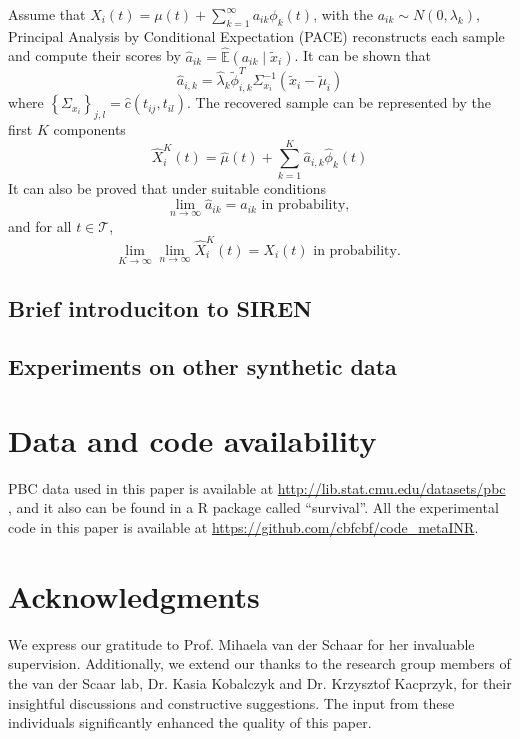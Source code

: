 \documentclass{article}
\begin{document}
Assume that $X_i(t)=\mu(t)+\sum_{k=1}^{\infty} a_{i k} \phi_k(t)$, with the $a_{i k} \sim N\left(0, \lambda_k\right)$,
Principal Analysis by Conditional Expectation (PACE) reconstructs each sample and compute their scores by $\widehat{a}_{i k}=\hat{\mathbb{E}}\left(a_{i k} \mid \tilde{x}_i\right)$.
It can be shown that 
$$
\widehat{a}_{i, k}=\widehat{\lambda}_k \tilde{\phi}_{i, k}^T \Sigma_{x_i}^{-1}\left(\tilde{x}_i-\tilde{\mu}_i\right)
$$
where $\left\{\Sigma_{x_i}\right\}_{j, l}=\widehat{c}\left(t_{ij}, t_{il}\right)$.
The recovered sample can be represented by the first $K$ components 
$$\widehat{X}_i^K(t)=\widehat{\mu}(t)+\sum_{k=1}^K \widehat{a}_{i, k} \widehat{\phi}_k(t)$$
It can also be proved \cite{yao2005functional}  that under suitable conditions
$$
\lim _{n \rightarrow \infty} \hat{a}_{i k}={a}_{i k} \text { in probability, }
$$
and for all $t \in \mathcal{T}$,
$$
\lim _{K \rightarrow \infty} \lim _{n \rightarrow \infty} \widehat{X}_i^K(t)={X}_i(t) \text { in probability. }
$$


\subsection{Brief introduciton to SIREN}


\subsection{Experiments on other synthetic data}

\section*{Data and code availability}
PBC data used in this paper is available at \url{http://lib.stat.cmu.edu/datasets/pbc} , and it also can be found in a R package called ``survival''.
All the experimental code in this paper is available at \url{https://github.com/cbfcbf/code\_metaINR}.

\section*{Acknowledgments}
We express our gratitude to Prof. Mihaela van der Schaar for her invaluable supervision. 
Additionally, we extend our thanks to the research group members of the van der Scaar lab, Dr. Kasia Kobalczyk and Dr. Krzysztof Kacprzyk, for their insightful discussions and constructive suggestions. 
The input from these individuals significantly enhanced the quality of this paper.

\end{document}
